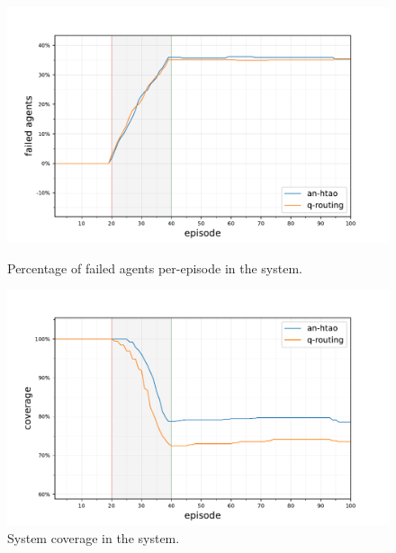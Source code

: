 \begin{figure}[ht]
	\begin{minipage}{.49\textwidth}
		\centering
		\includegraphics[width=1.0\linewidth,trim={25pt 0pt 50pt 0pt},clip]{7balanced_coverage-failed-agents}
		\captionsetup{labelfont=bf,singlelinecheck=on}
		\caption{Percentage of failed agents per-episode \newline in the \simulationNodeFailure{}{} system.}
		\label{fig:node_failure_failed_agents}
	\end{minipage}
	\begin{minipage}{.49\textwidth}
		\centering
		\includegraphics[width=1.0\linewidth,trim={25pt 0pt 50pt 0pt},clip]{7balanced_coverage-coverage}
		\captionsetup{labelfont=bf,singlelinecheck=on}
		\caption{System coverage in the \simulationNodeFailure{}{} \newline system.}
		\label{fig:node_failure_coverage}
	\end{minipage}\hfill%
\end{figure}


